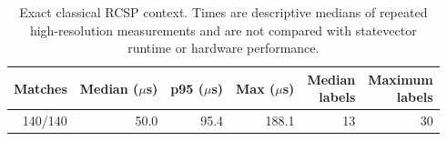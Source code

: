 \begin{table}[t]
\centering
\caption{Exact classical RCSP context. Times are descriptive medians of
repeated high-resolution measurements and are not compared with statevector
runtime or hardware performance.}
\label{tab:reviewer-classical}
\scriptsize
\setlength{\tabcolsep}{4pt}
\begin{tabular}{@{}rrrrrr@{}}
\toprule
Matches & Median ($\mu$s) & p95 ($\mu$s) & Max ($\mu$s) & \shortstack{Median\\labels} & \shortstack{Maximum\\labels} \\
\midrule
140/140 & 50.0 & 95.4 & 188.1 & 13 & 30 \\
\bottomrule
\end{tabular}
\end{table}

